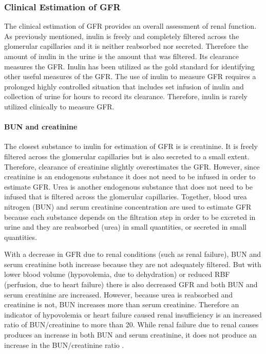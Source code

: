 \subsubsection{Clinical Estimation of GFR}

The clinical estimation of GFR provides an overall assessment of renal function. As previously mentioned, inulin is freely and completely filtered across the glomerular capillaries and it is neither reabsorbed nor secreted. Therefore the amount of inulin in the urine is the amount that was filtered. Its clearance measures the GFR. Inulin has been utilized as the gold standard for identifying other useful measures of the GFR. The use of inulin to measure GFR requires a prolonged highly controlled situation that includes set infusion of inulin and collection of urine for hours to record its clearance. Therefore, inulin is rarely utilized clinically to measure GFR.

\paragraph{BUN and creatinine}

The closest substance to inulin for estimation of GFR is is creatinine. It is freely filtered across the glomerular capillaries but is also secreted to a small extent. Therefore, clearance of creatinine slightly overestimates the GFR. However, since creatinine is an endogenous substance it does not need to be infused in order to estimate GFR. Urea is another endogenous substance that does not need to be infused that is filtered across the glomerular capillaries. Together, blood urea nitrogen (BUN) and serum creatinine concentration are used to estimate GFR because each substance depends on the filtration step in order to be excreted in urine and they are reabsorbed (urea) in small quantities, or secreted in small quantities. 

With a decrease in GFR due to renal conditions (such as renal failure), BUN and serum creatinine both increase because they are not adequately filtered. But with lower blood volume (hypovolemia, due to dehydration) or reduced RBF (perfusion, due to heart failure) there is also decreased GFR and both BUN and serum creatinine are increased. However, because urea is reabsorbed and creatinine is not, BUN increases more than serum creatinine. Therefore an indicator of hypovolemia or heart failure caused renal insufficiency is an increased ratio of BUN/creatinine to more than 20. While renal failure due to renal causes produces an increase in both BUN and serum creatinine, it does not produce an increase in the BUN/creatinine ratio \cite{hall_guyton_2020}.



